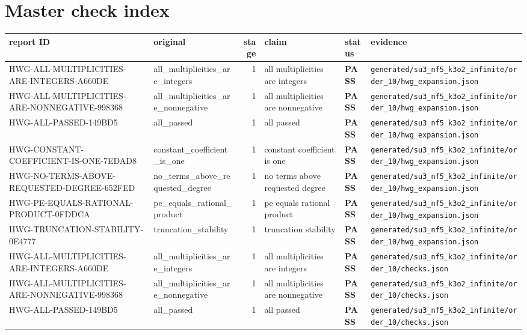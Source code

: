 \documentclass[11pt]{article}
\newcommand{\Pass}{\textcolor{green!50!black}{\textbf{PASS}}}
\newcommand{\RawPath}[1]{\texttt{#1}}
\begin{document}
\section{Master check index}
\begin{longtable}{p{3cm}p{2.5cm}r p{3cm}l p{2cm}}\toprule report ID & original & stage & claim & status & evidence\\\midrule\endhead
HWG-ALL-MULTIPLICITIES-ARE-INTEGERS-A660DE & all\_multiplicities\_are\_integers & 1 & all multiplicities are integers & \Pass & \RawPath{generated/su3\_nf5\_k3o2\_infinite/order\_10/hwg\_expansion.json}\\
HWG-ALL-MULTIPLICITIES-ARE-NONNEGATIVE-998368 & all\_multiplicities\_are\_nonnegative & 1 & all multiplicities are nonnegative & \Pass & \RawPath{generated/su3\_nf5\_k3o2\_infinite/order\_10/hwg\_expansion.json}\\
HWG-ALL-PASSED-149BD5 & all\_passed & 1 & all passed & \Pass & \RawPath{generated/su3\_nf5\_k3o2\_infinite/order\_10/hwg\_expansion.json}\\
HWG-CONSTANT-COEFFICIENT-IS-ONE-7EDAD8 & constant\_coefficient\_is\_one & 1 & constant coefficient is one & \Pass & \RawPath{generated/su3\_nf5\_k3o2\_infinite/order\_10/hwg\_expansion.json}\\
HWG-NO-TERMS-ABOVE-REQUESTED-DEGREE-652FED & no\_terms\_above\_requested\_degree & 1 & no terms above requested degree & \Pass & \RawPath{generated/su3\_nf5\_k3o2\_infinite/order\_10/hwg\_expansion.json}\\
HWG-PE-EQUALS-RATIONAL-PRODUCT-0FDDCA & pe\_equals\_rational\_product & 1 & pe equals rational product & \Pass & \RawPath{generated/su3\_nf5\_k3o2\_infinite/order\_10/hwg\_expansion.json}\\
HWG-TRUNCATION-STABILITY-0E4777 & truncation\_stability & 1 & truncation stability & \Pass & \RawPath{generated/su3\_nf5\_k3o2\_infinite/order\_10/hwg\_expansion.json}\\
HWG-ALL-MULTIPLICITIES-ARE-INTEGERS-A660DE & all\_multiplicities\_are\_integers & 1 & all multiplicities are integers & \Pass & \RawPath{generated/su3\_nf5\_k3o2\_infinite/order\_10/checks.json}\\
HWG-ALL-MULTIPLICITIES-ARE-NONNEGATIVE-998368 & all\_multiplicities\_are\_nonnegative & 1 & all multiplicities are nonnegative & \Pass & \RawPath{generated/su3\_nf5\_k3o2\_infinite/order\_10/checks.json}\\
HWG-ALL-PASSED-149BD5 & all\_passed & 1 & all passed & \Pass & \RawPath{generated/su3\_nf5\_k3o2\_infinite/order\_10/checks.json}\\

\end{longtable}
\end{document}
